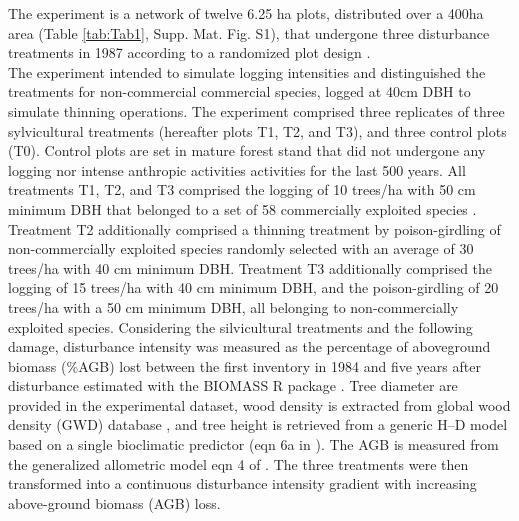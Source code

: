 \documentclass[fleqn,10pt]{ArtEcoFoG} %
\begin{document}
The experiment is a network of twelve 6.25 ha plots\color{red}, distributed over a 400ha area \color{black}(Table \ref{tab:Tab1}, Supp. Mat. Fig. S1), that undergone three disturbance treatments in 1987 according to a randomized plot design \citep{Gourlet-Fleury2004}.\\
\color{red}The experiment intended to simulate logging intensities and distinguished the treatments for non-commercial commercial species, logged at 40cm DBH to simulate thinning operations.\color{black}
The experiment comprised three replicates of three sylvicultural treatments (hereafter plots T1, T2, and T3), and three control plots (T0).
\color{red}Control plots are set in mature forest stand that did not undergone any logging nor intense anthropic activities activities for the last 500 years\color{black}.
All treatments T1, T2, and T3 comprised the logging of 10 trees/ha with 50 cm minimum DBH that belonged to a set of 58 commercially exploited species \citep{Gourlet-Fleury2004}.
Treatment T2 additionally comprised a thinning treatment by poison-girdling of non-commercially exploited species randomly selected with an average of 30 trees/ha with 40 cm minimum DBH.
Treatment T3 additionally comprised the logging of 15 trees/ha with 40 cm minimum DBH, and the poison-girdling of 20 trees/ha with a 50 cm minimum DBH, all belonging to non-commercially exploited species.
Considering the silvicultural treatments and the following damage, disturbance intensity was measured as the percentage of aboveground biomass (\%AGB) lost between the first inventory in 1984 and five years after disturbance \citep{Piponiot2016} estimated with the BIOMASS R package \citep{Rejou2017}.
\color{red}
Tree diameter are provided in the experimental dataset, wood density is extracted from global wood density (GWD) database \citep{Zanne2009}, and tree height is retrieved from a generic H--D model based on a single bioclimatic predictor (eqn 6a in \citep{Chave2014}).
The AGB is measured from the generalized allometric model eqn 4 of \citep{Chave2014}.
\color{black}
The three treatments were then transformed into a continuous disturbance intensity gradient with increasing above-ground biomass (AGB) loss.
\end{document}
